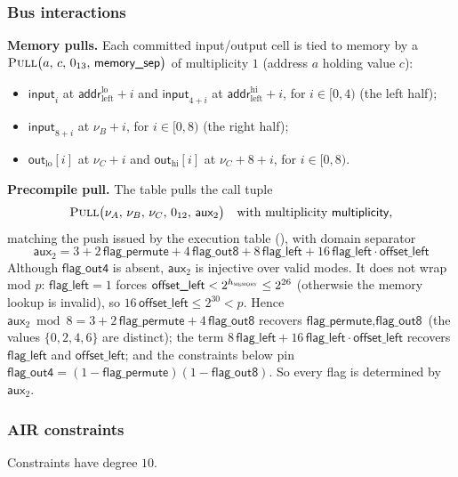 \documentclass{article}
\theoremstyle{definition}
\begin{document}
\subsubsection{Bus interactions}
\textbf{Memory pulls.} Each committed input/output cell is tied to memory by a $\textsc{Pull}\big(a,\, c,\, 0_{13},\, \textsf{memory\_sep}\big)$ of multiplicity $1$ (address $a$ holding value $c$):
\begin{itemize}
    \item $\textsf{input}_i$ at $\textsf{addr}^\text{lo}_\text{left} + i$ and $\textsf{input}_{4+i}$ at $\textsf{addr}^\text{hi}_\text{left} + i$, for $i \in [0, 4)$ (the left half);
    \item $\textsf{input}_{8+i}$ at $\nu_B + i$, for $i \in [0, 8)$ (the right half);
    \item $\textsf{out}_\text{lo}[i]$ at $\nu_C + i$ and $\textsf{out}_\text{hi}[i]$ at $\nu_C + 8 + i$, for $i \in [0, 8)$.
\end{itemize}

\textbf{Precompile pull.} The table pulls the call tuple
\[
\textsc{Pull}\big(\nu_A,\, \nu_B,\, \nu_C,\, 0_{12},\, \textsf{aux}_2\big) \quad \text{with multiplicity } \textsf{multiplicity},
\]
matching the push issued by the execution table (), with domain separator
\[
\textsf{aux}_2 = 3 + 2\,\textsf{flag\_permute} + 4\,\textsf{flag\_out8} + 8\,\textsf{flag\_left} + 16\,\textsf{flag\_left} \cdot \textsf{offset\_left}
\]
Although $\textsf{flag\_out4}$ is absent, $\textsf{aux}_2$ is injective over valid modes. It does not wrap mod $p$: $\textsf{flag\_left} = 1$ forces $\textsf{offset\_left} < 2^{h_\textsc{memory}} \leq 2^{26}$ (otherwsie the memory lookup is invalid), so $16\,\textsf{offset\_left} \leq 2^{30} < p$. Hence $\textsf{aux}_2 \bmod 8 = 3 + 2\,\textsf{flag\_permute} + 4\,\textsf{flag\_out8}$ recovers $\textsf{flag\_permute}, \textsf{flag\_out8}$ (the values $\{0,2,4,6\}$ are distinct); the term $8\,\textsf{flag\_left} + 16\,\textsf{flag\_left} \cdot \textsf{offset\_left}$ recovers $\textsf{flag\_left}$ and $\textsf{offset\_left}$; and the constraints below pin $\textsf{flag\_out4} = (1 - \textsf{flag\_permute})(1 - \textsf{flag\_out8})$. So every flag is determined by $\textsf{aux}_2$.

\subsubsection{AIR constraints}

Constraints have degree $10$.
\end{document}
